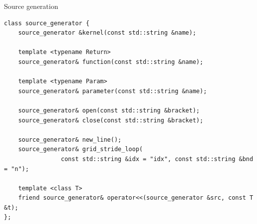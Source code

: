 \documentclass[@BEAMER_OPTIONS@]{beamer}
\begin{document}
\begin{frame}[fragile]{Source generation}
    \begin{exampleblock}{}
        \begin{lstlisting}
class source_generator {
    source_generator &kernel(const std::string &name);

    template <typename Return>
    source_generator& function(const std::string &name);

    template <typename Param>
    source_generator& parameter(const std::string &name);

    source_generator& open(const std::string &bracket);
    source_generator& close(const std::string &bracket);

    source_generator& new_line();
    source_generator& grid_stride_loop(
                const std::string &idx = "idx", const std::string &bnd = "n");

    template <class T>
    friend source_generator& operator<<(source_generator &src, const T &t);
};
        \end{lstlisting}
    \end{exampleblock}
\end{frame}
\end{document}
